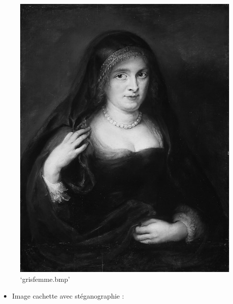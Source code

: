 \documentclass[11pt]{article}
\makeatletter
\def\maxwidth{\ifdim\Gin@nat@width>\linewidth\linewidth
    \else\Gin@nat@width\fi}
\let\Oldincludegraphics\includegraphics
\renewcommand{\includegraphics}[1]{\Oldincludegraphics[width=.8\maxwidth]{#1}}
\providecommand{\tightlist}{%
      \setlength{\itemsep}{0pt}\setlength{\parskip}{0pt}}
\makeatother
\begin{document}
\begin{figure}
\centering
\includegraphics{grisfemme.bmp}
\caption{`grisfemme.bmp'}
\end{figure}

\begin{itemize}
\tightlist
\item
  Image cachette avec stéganographie :
\end{itemize}
\end{document}
